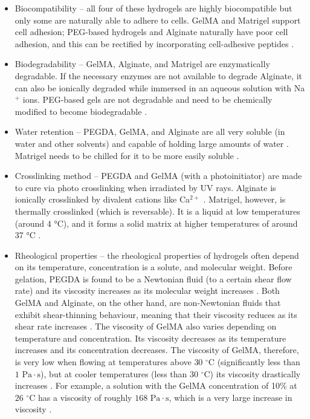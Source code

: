 \begin{itemize}
  \item Biocompatibility – all four of these hydrogels are highly biocompatible but only some are naturally able to adhere to cells. GelMA and Matrigel support cell adhesion; PEG-based hydrogels and Alginate naturally have poor cell adhesion, and this can be rectified by incorporating cell-adhesive peptides \citep{liwu2020}.
  \item Biodegradability – GelMA, Alginate, and Matrigel are enzymatically degradable. If the necessary enzymes are not available to degrade Alginate,  it can also be ionically degraded while immersed in an aqueous solution with Na\(^+\) ions. PEG-based gels are not degradable and need to be chemically modified to become biodegradable \citep{liwu2020}.
  \item Water retention – PEGDA, GelMA, and Alginate are all very soluble (in water and other solvents) and capable of holding large amounts of water \citep{liwu2020}. Matrigel needs to be chilled for it to be more easily soluble \citep{merceron_2015}.
  \item Crosslinking method – PEGDA and GelMA (with a photoinitiator) are made to cure via photo crosslinking when irradiated by UV rays. Alginate is ionically crosslinked by divalent cations like Ca\(^{2+}\) \citep{liwu2020}. Matrigel, however, is thermally crosslinked (which is reversable). It is a liquid at low temperatures (around 4 °C), and it forms a solid matrix at higher temperatures of around 37 °C \citep{merceron_2015}.
  \item Rheological properties – the rheological properties of hydrogels often depend on its temperature, concentration is a solute, and molecular weight. Before gelation, PEGDA is found to be a Newtonian fluid (to a certain shear flow rate) and its viscosity increases as its molecular weight increases \citep{brikov_2016}. Both GelMA and Alginate, on the other hand, are non-Newtonian fluids that exhibit shear-thinning behaviour, meaning that their viscosity reduces as its shear rate increases \citep{gregory_2022}. The viscosity of GelMA also varies depending on temperature and concentration. Its viscosity decreases as its temperature increases and its concentration decreases. The viscosity of GelMA, therefore, is very low when flowing at temperatures above \(30\,\,^{\circ}\mathrm{C}\) (significantly less than \(1\,\,\mathrm{Pa \cdot s}\)), but at cooler temperatures (less than \(30\,\,^{\circ}\mathrm{C}\)) its viscosity drastically increases \citep{adhikari2021photoinduced}. For example, a solution with the GelMA concentration of 10\% at \(26\,\,^{\circ}\mathrm{C}\) has a viscosity of roughly \(168\,\,\mathrm{Pa \cdot s}\), which is a very large increase in viscosity \citep{cellink_gelma_2020}.

\end{itemize}

